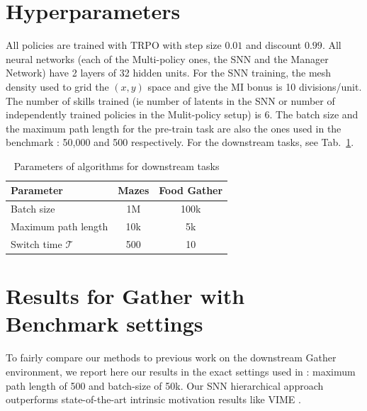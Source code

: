 \documentclass{article} %
\begin{document}




\appendix
\section{Hyperparameters}
\label{sec:hyper}
All policies are trained with TRPO with step size $0.01$ and discount $0.99$. All neural networks (each of the Multi-policy ones, the SNN and the Manager Network) have 2 layers of 32 hidden units. For the SNN training, the mesh density used to grid the $(x, y)$ space and give the MI bonus is 10 divisions/unit. The number of skills trained (ie number of latents in the SNN or number of independently trained policies in the Mulit-policy setup) is 6. The batch size and the maximum path length for the pre-train task are also the ones used in the benchmark \citep{duan2016benchmarking}: 50,000 and 500 respectively. For the downstream tasks, see Tab.\ \ref{tab:params}.

\begin{table}[h!]
\centering
\begin{tabular}[t]{l|c|c}
Parameter & Mazes & Food Gather \\
\hline
Batch size & 1M & 100k \\
Maximum path length & 10k & 5k \\
Switch time $\mathcal{T}$ & 500 & 10
\end{tabular}
\caption{Parameters of algorithms for downstream tasks}
\label{tab:params}
\end{table}


\section{Results for Gather with Benchmark settings}
\label{sec:gather_compare}
To fairly compare our methods to previous work on the downstream Gather environment, we report here our results in the exact settings used in \citet{duan2016benchmarking}: maximum path length of 500 and batch-size of 50k. Our SNN hierarchical approach outperforms state-of-the-art intrinsic motivation results like VIME \citep{houthooft2016variational}.
\end{document}
